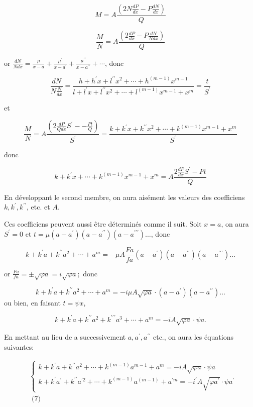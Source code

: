\documentclass{article}
\begin{document}
\[
M=A \frac{\left(2 N \frac{d P}{d x}-P \frac{d N}{d x}\right)}{Q}
\]

\[
\frac{M}{N}=A \frac{\left(2 \frac{d P}{d x}-P \frac{d N}{N d x}\right)}{Q}
\]

or \(\frac{d N}{N d x}=\frac{\mu}{x-a}+\frac{\mu^{\prime}}{x-a^{\prime}}+\frac{\mu^{\prime \prime}}{x-a^{\prime \prime}}+\cdots\), donc

\[
\frac{d N}{N \frac{N}{d x}}=\frac{h+h^{\prime} x+l^{\prime \prime} x^{2}+\cdots+h^{(m-1)} x^{m-1}}{l+l^{\prime} x+l^{\prime \prime} x^{2}+\cdots+l^{(m-1)} x^{m-1}+x^{m}}=\frac{t}{S^{\prime}}
\]

et

\[
\frac{M}{N}=A \frac{\left(2 \frac{d P}{Q d x} S^{\prime}--\frac{P t}{Q}\right)}{S^{\prime}}=\frac{k+k^{\prime} x+k^{\prime \prime} x^{2}+\cdots+k^{(m-1)} x^{m-1}+x^{m}}{S^{\prime}}
\]

donc

\[
k+k^{\prime} x+\cdots+k^{(m-1)} x^{m-1}+x^{m}=A \frac{2 \frac{d P}{d x} S^{\prime}-P t}{Q}
\]

En développant le second membre, on aura aisément les valeurs des coefficiens \(k, k^{\prime}, k^{\prime \prime}\), etc. et \(A\).

Ces coefficiens peuvent aussi être déterminés comme il suit. Soit \(x=a\), on aura \(S^{\prime}=0\) et \(t=\mu\left(a-a^{\prime}\right)\left(a-a^{\prime \prime}\right)\left(a-a^{\prime \prime \prime}\right) \ldots\), donc

\[
k+k^{\prime} a+k^{\prime \prime} a^{2}+\cdots+a^{m}=-\mu A \frac{F a}{f a}\left(a-a^{\prime}\right)\left(a-a^{\prime \prime}\right)\left(a-a^{\prime \prime \prime}\right) \ldots
\]

or \(\frac{F a}{f a}= \pm \sqrt{\varphi a}=i \sqrt{\varphi a} ;\) donc

\[
k+k^{\prime} a+k^{\prime \prime} a^{2}+\cdots+a^{m}=-i \mu A \sqrt{\varphi a} \cdot\left(a-a^{\prime}\right)\left(a-a^{\prime \prime}\right) \ldots
\]
ou bien, en faisant \(t=\psi x\),

\[
k+k^{\prime} a+k^{\prime \prime} a^{2}+k^{\prime \prime \prime} a^{3}+\cdots+a^{m}=-i A \sqrt{\varphi a} \cdot \psi a .
\]

En mettant au lieu de a successivement \(a, a^{\prime}, a^{\prime \prime}\) etc., on aura les équations suivantes:

\[
\begin{aligned}
& \left\{\begin{array}{l}
k+k^{\prime} a+k^{\prime \prime} a^{2}+\cdots+k^{(m-1)} a^{m-1}+a^{m}=-i A \sqrt{\varphi a} \cdot \psi a \\
k+k^{\prime} a^{\prime}+k^{\prime \prime} a^{\prime 2}+\cdots+k^{(m-1)} a^{(m-1)}+a^{\prime m}=-i^{\prime} A \sqrt{\varphi a^{\prime}} \cdot \psi a^{\prime}
\end{array}\right. \\
& \text { (7) }
\end{aligned}
\]
\end{document}
